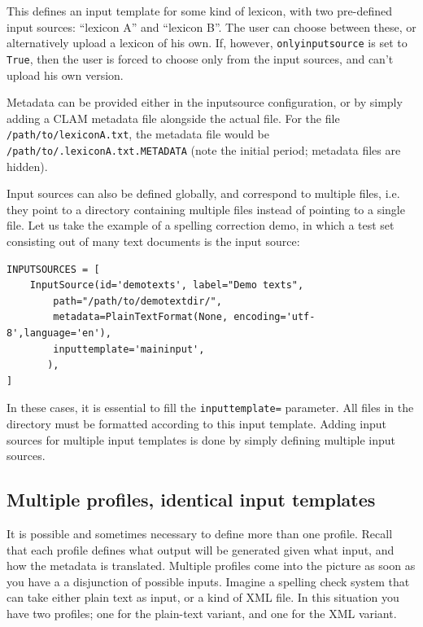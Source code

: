 \documentclass[a4paper,12pt]{report}
\begin{document}
This defines an input template for some kind of lexicon, with two pre-defined input sources: ``lexicon A'' and ``lexicon B''. The user can choose between these, or alternatively upload a lexicon of his own. If, however, \texttt{onlyinputsource} is set to \texttt{True}, then the user is forced to choose only from the input sources, and can't upload his own version. 

Metadata can be provided either in the inputsource configuration, or by simply adding a CLAM metadata file alongside the actual file. For the file \texttt{/path/to/lexiconA.txt}, the metadata file would be \texttt{/path/to/.lexiconA.txt.METADATA} (note the initial period; metadata files are hidden). 

Input sources can also be defined globally, and correspond to multiple files, i.e. they point to a directory containing multiple files instead of pointing to a single file. Let us take the example of a spelling correction demo, in which a test set consisting out of many text documents is the input source:

\begin{verbatim}
INPUTSOURCES = [
    InputSource(id='demotexts', label="Demo texts",
        path="/path/to/demotextdir/", 
        metadata=PlainTextFormat(None, encoding='utf-8',language='en'),
        inputtemplate='maininput',
       ),
]
\end{verbatim}

In these cases, it is essential to fill the \texttt{inputtemplate=} parameter. All files in the directory must be formatted according to this input template. Adding input sources for multiple input templates is done by simply defining multiple input sources. %

\subsection{Multiple profiles, identical input templates}

It is possible and sometimes necessary to define more than one profile. Recall that each profile defines what output will be generated given what input, and how the metadata is translated. Multiple profiles come into the picture as soon as you have a a disjunction of possible inputs. Imagine a spelling check system that can take either plain text as input, or a kind of XML file. In this situation you have two profiles; one for the plain-text variant, and one for the XML variant. 
\end{document}
